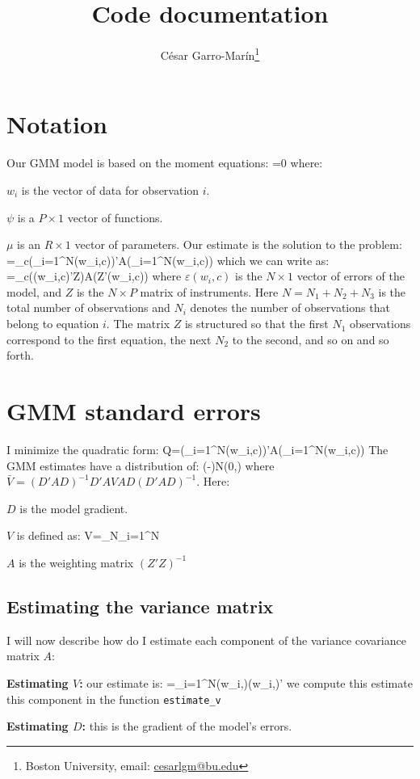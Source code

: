 \documentclass[a4paper, 12pt]{article}
\title{Code documentation}
\author{C\'esar Garro-Mar\'in\thanks{Boston University, email: \href{mailto:cesarlgm@bu.edu}{cesarlgm@bu.edu}}}
\begin{document}
\maketitle
\section{Notation}
Our GMM model is based on the moment equations:
\beqns
{}=0	
\eeqns
where:
\bitem
\item $w_i$ is the vector of data for observation $i$.
\item $\psi$ is a $P\times 1$ vector of functions.
\item $\mu$ is an $R\times 1$ vector of parameters. 
\eitem 
Our estimate is the solution to the problem:
\beqns
\hat{\mu}=\arg\min_c\left(\sum_{i=1}^{N}\psi(w_i,c)\right)'A\left(\sum_{i=1}^{N}\psi(w_i,c)\right)
\eeqns
which we can write as:
\beqns
\hat{\mu}=\arg\min_c\left(\varepsilon(w_i,c)'Z\right)A\left(Z'\varepsilon(w_i,c)\right)
\eeqns
where $\varepsilon(w_i,c)$ is the $N\times 1$ vector of errors of the model, and $Z$ is the $N\times P$ matrix of instruments. Here $N=N_1+N_2+N_3$ is the total number of observations and $N_i$ denotes the number of observations that belong to equation $i$. The matrix $Z$ is structured so that the first $N_1$ observations correspond to the first equation, the next $N_2$ to the second, and so on and so forth. 

\section{GMM standard errors}
I minimize the quadratic form:
\beqn
Q=\left(\sum_{i=1}^{N}\psi(w_i,c)\right)'A\left(\sum_{i=1}^{N}\psi(w_i,c)\right)
\eeqn 
The GMM estimates have a distribution of:
\beqns
{}(\hat\mu-\mu)\rightarrow N(0,)
\eeqns
where $\bar{V}=(D'AD)^{-1}D'AVAD(D'AD)^{-1}$. Here:
\bitem
	\item $D$ is the model gradient.
	\item $V$ is defined as:
	\beqns
		V=\lim_{N\rightarrow\infty}\sum_{i=1}^N
	\eeqns
	\item $A$ is the weighting matrix $(Z'Z)^{-1}$
\eitem

\subsection{Estimating the variance matrix}
I will now describe how do I estimate each component of the variance covariance matrix $A$:
\bitem 
	\item \textbf{Estimating $V$:} our estimate is:
	\beqns
	=\sum_{i=1}^N\psi(w_i,\hat{\mu})\psi(w_i,\hat{\mu})'
	\eeqns
	we compute this estimate this component in the function {\tt estimate\_v}
	\item \textbf{Estimating $D$:} this is the gradient of the model's errors. 
\eitem
\end{document}
